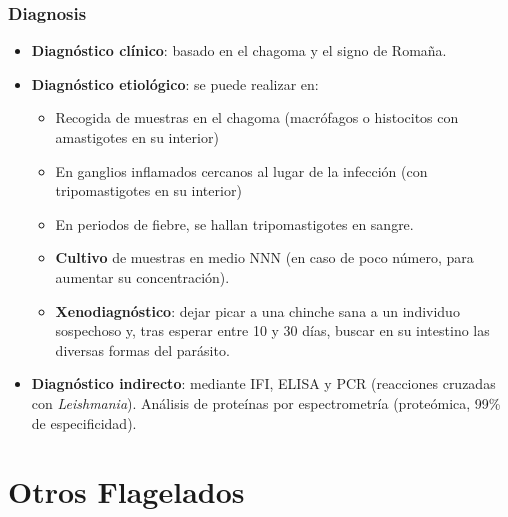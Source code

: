 \subsubsection{Diagnosis}
\begin{itemize}[itemsep=0pt,parsep=0pt,topsep=0pt,partopsep=0pt] 
	\item \textbf{Diagnóstico clínico}: basado en el chagoma y el signo de Romaña.
	\item \textbf{Diagnóstico etiológico}: se puede realizar en:
	\begin{itemize}[itemsep=0pt,parsep=0pt,topsep=0pt,partopsep=0pt] 
		\item Recogida de muestras en el chagoma (macrófagos o histocitos con amastigotes en su interior)
		\item En ganglios inflamados cercanos al lugar de la infección (con tripomastigotes en su interior)
		\item En periodos de fiebre, se hallan tripomastigotes en sangre.
		\item \textbf{Cultivo} de muestras en medio NNN (en caso de poco número, para aumentar su concentración).
		\item \textbf{Xenodiagnóstico}: dejar picar a una chinche sana a un individuo sospechoso y, tras esperar entre 10 y 30 días, buscar en su intestino las diversas formas del parásito.
	\end{itemize}
	\item \textbf{Diagnóstico indirecto}: mediante IFI, ELISA y PCR (reacciones cruzadas con \textit{Leishmania}). Análisis de proteínas por espectrometría (proteómica, 99\% de especificidad).
\end{itemize}
\newpage
\section{Otros Flagelados}
